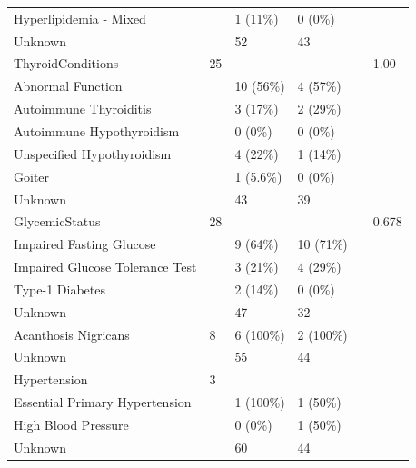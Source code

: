 \documentclass[
]{article}
\begin{document}
\begin{table}[!h]
\begin{tabular}[t]{llllll}
\hspace{1em}Hyperlipidemia - Mixed &  & 1 (11\%) & 0 (0\%) &  & \\
\addlinespace
\hspace{1em}Unknown &  & 52 & 43 &  & \\
ThyroidConditions & 25 &  &  &  & 1.00\\
\hspace{1em}Abnormal Function &  & 10 (56\%) & 4 (57\%) &  & \\
\hspace{1em}Autoimmune Thyroiditis &  & 3 (17\%) & 2 (29\%) &  & \\
\hspace{1em}Autoimmune Hypothyroidism &  & 0 (0\%) & 0 (0\%) &  & \\
\addlinespace
\hspace{1em}Unspecified Hypothyroidism &  & 4 (22\%) & 1 (14\%) &  & \\
\hspace{1em}Goiter &  & 1 (5.6\%) & 0 (0\%) &  & \\
\hspace{1em}Unknown &  & 43 & 39 &  & \\
GlycemicStatus & 28 &  &  &  & 0.678\\
\hspace{1em}Impaired Fasting Glucose &  & 9 (64\%) & 10 (71\%) &  & \\
\addlinespace
\hspace{1em}Impaired Glucose Tolerance Test &  & 3 (21\%) & 4 (29\%) &  & \\
\hspace{1em}Type-1 Diabetes &  & 2 (14\%) & 0 (0\%) &  & \\
\hspace{1em}Unknown &  & 47 & 32 &  & \\
Acanthosis Nigricans & 8 & 6 (100\%) & 2 (100\%) &  & \\
\hspace{1em}Unknown &  & 55 & 44 &  & \\
\addlinespace
Hypertension & 3 &  &  &  & \\
\hspace{1em}Essential Primary Hypertension &  & 1 (100\%) & 1 (50\%) &  & \\
\hspace{1em}High Blood Pressure &  & 0 (0\%) & 1 (50\%) &  & \\
\hspace{1em}Unknown &  & 60 & 44 &  & \\

\end{tabular}
\end{table}
\end{document}
